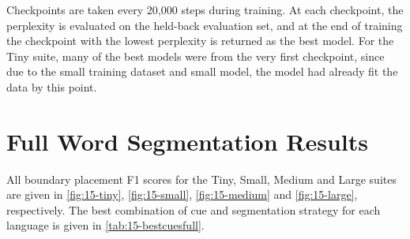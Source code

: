 Checkpoints are taken every 20,000 steps during training. At each checkpoint, the perplexity is evaluated on the held-back evaluation set, and at the end of training the checkpoint with the lowest perplexity is returned as the best model. For the Tiny suite, many of the best models were from the very first checkpoint, since due to the small training dataset and small model, the model had already fit the data by this point.

\section{Full Word Segmentation Results}\label{app:15-othersegresults}

All boundary placement F1 scores for the Tiny, Small, Medium and Large suites are given in \cref{fig:15-tiny}, \cref{fig:15-small}, \cref{fig:15-medium} and \cref{fig:15-large}, respectively. The best combination of cue and segmentation strategy for each language is given in \cref{tab:15-bestcuesfull}.



